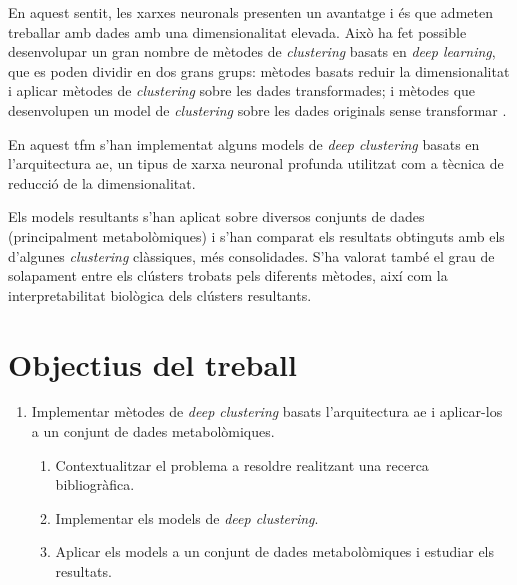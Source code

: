\documentclass[CAT,BIB]{TFUOC}%
\begin{document}
        En aquest sentit,
        les xarxes neuronals presenten un avantatge
        i és que admeten treballar amb dades amb una dimensionalitat elevada.
        Això ha fet possible desenvolupar
        un gran nombre de mètodes de \textit{clustering}
        basats en \textit{deep learning},
        que es poden dividir en dos grans grups:
        mètodes basats reduir la dimensionalitat
        i aplicar mètodes de \textit{clustering} sobre les dades transformades;
        i mètodes que desenvolupen un model de \textit{clustering}
        sobre les dades originals sense transformar \citep{Karim2021}.

        En aquest \gls{tfm}
        s'han implementat alguns models de \textit{deep clustering}
        basats en l'arquitectura \gls{ae},
        un tipus de xarxa neuronal profunda
        utilitzat com a tècnica de reducció de la dimensionalitat.

        Els models resultants s'han aplicat sobre diversos conjunts de dades
        (principalment metabolòmiques)
        i s'han comparat els resultats obtinguts
        amb els d'algunes \textit{clustering} clàssiques,
        més consolidades.
        S'ha valorat també el grau de solapament entre els clústers trobats pels diferents mètodes,
        així com la interpretabilitat biològica dels clústers resultants.

    \section{Objectius del treball}
    \label{s:objectius}

        \begin{enumerate}
            \item Implementar mètodes de \textit{deep clustering} basats l'arquitectura \gls{ae} i aplicar-los a un conjunt de dades metabolòmiques.
            \begin{enumerate}
                \item Contextualitzar el problema a resoldre realitzant una recerca bibliogràfica.
                \item Implementar els models de \textit{deep clustering}.
                \item Aplicar els models a un conjunt de dades metabolòmiques i estudiar els resultats.
            \end{enumerate}
        \end{enumerate}
\end{document}
